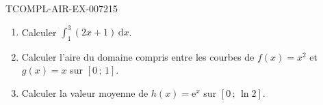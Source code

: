 \begin{exercice}{TCOMPL-AIR-EX-007}{2}{15}
\begin{enumerate}
  \item Calculer $\displaystyle\int_1^3 (2x+1)\,\mathrm{d}x$.
  \item Calculer l'aire du domaine compris entre les courbes de
        $f(x)=x^2$ et $g(x)=x$ sur $[0\,;\,1]$.
  \item Calculer la valeur moyenne de $h(x)=\mathrm{e}^{x}$ sur
        $[0\,;\,\ln 2]$.
\end{enumerate}
\end{exercice}
